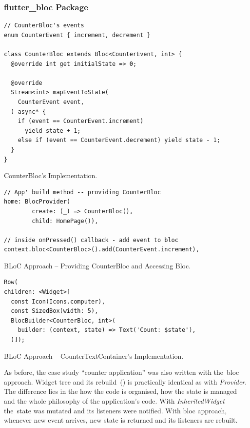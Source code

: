 \subsubsection{flutter\_bloc Package}
\begin{listing}[ht]
\begin{verbatim}
// CounterBloc's events
enum CounterEvent { increment, decrement }

class CounterBloc extends Bloc<CounterEvent, int> {
  @override int get initialState => 0;

  @override
  Stream<int> mapEventToState(
    CounterEvent event,
  ) async* {
    if (event == CounterEvent.increment)
      yield state + 1;
    else if (event == CounterEvent.decrement) yield state - 1;
  }
}
\end{verbatim}
\caption{CounterBloc's Implementation.}
\label{listing:counter-bloc-bloc}
\end{listing}

\begin{listing}[ht]
\begin{verbatim}
// App' build method -- providing CounterBloc
home: BlocProvider(
        create: (_) => CounterBloc(),
        child: HomePage()),
        
// inside onPressed() callback - add event to bloc
context.bloc<CounterBloc>().add(CounterEvent.increment),
\end{verbatim}
\caption{BLoC Approach -- Providing CounterBloc and Accessing Bloc.}
\label{listing:counter-bloc-homepage}
\end{listing}

\begin{listing}[ht]
\begin{verbatim}
Row(
children: <Widget>[
  const Icon(Icons.computer),
  const SizedBox(width: 5),
  BlocBuilder<CounterBloc, int>(
    builder: (context, state) => Text('Count: $state'),
  )]);
\end{verbatim}
\caption{BLoC Approach -- CounterTextContainer's Implementation.}
\label{listing:counter-bloc-counter-text}
\end{listing}

As before, the case study ``counter application'' was also written with the~\gls{bloc} approach. Widget tree and its rebuild~() is practically identical as with \textit{Provider}. The difference lies in the how the code is organised, how the state is managed and the whole philosophy of the application's code. With \textit{InheritedWidget} the~state was mutated and its listeners were notified. With \gls{bloc} approach, whenever new event arrives, new state is returned and its listeners are rebuilt. 

